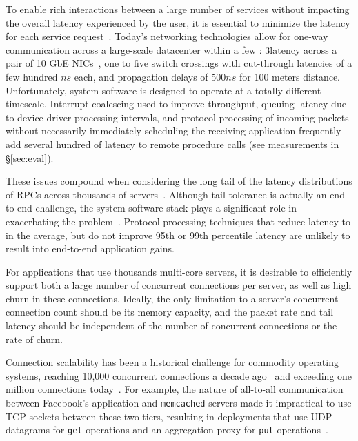  To enable rich interactions
between a large number of services %
without impacting the overall latency experienced by the user, it is essential
to minimize the latency for each service
request~\cite{luiz-isscc,rumble2011s}. Today's networking technologies
allow for one-way communication across a large-scale datacenter within
a few \microsecond: 3\microsecond latency across a pair of 10 GbE
NICs~\cite{cisco-sereno}, one to five switch crossings with
cut-through latencies of a few hundred $ns$ each, and propagation
delays of 500$ns$ for 100 meters distance. Unfortunately, system
software is designed to operate at a totally different
timescale. Interrupt coalescing used to improve throughput, queuing
latency due to device driver processing intervals, and protocol
processing of incoming packets without necessarily immediately
scheduling the receiving application frequently add several hundred
\microsecond of latency to remote procedure calls (see measurements in
\S\ref{sec:eval}).


These issues compound when considering the long tail of the latency
distributions of RPCs across thousands of
servers~\cite{DBLP:journals/cacm/DeanB13}. Although tail-tolerance is
actually an end-to-end challenge, the system software stack plays a
significant role in exacerbating the problem~\cite{Leverich:RHSU:2014}.
Protocol-processing techniques that reduce latency to \microsecond in
the average, but do not improve 95th or 99th percentile latency are
unlikely to result into end-to-end application gains.

 For applications that use thousands
multi-core servers, it is desirable to efficiently support both a
large number of concurrent connections per server, as well as high
churn in these connections.  Ideally, the only limitation to a
server's concurrent connection count should be its memory capacity, and
the packet rate and tail latency should be independent of the number
of concurrent connections or the rate of churn.
 
Connection scalability has been a historical challenge for commodity
operating systems, reaching 10,000 concurrent connections a decade
ago~\cite{theC10Kproblem} and exceeding one million connections
today~\cite{theC10Mproblem}. For example, the nature of all-to-all
communication between Facebook's application and \texttt{memcached}
servers made it impractical to use TCP sockets between these two
tiers, resulting in deployments that use UDP datagrams for
\texttt{get} operations and an aggregation proxy for \texttt{put}
operations~\cite{nishtala2013scaling}.

